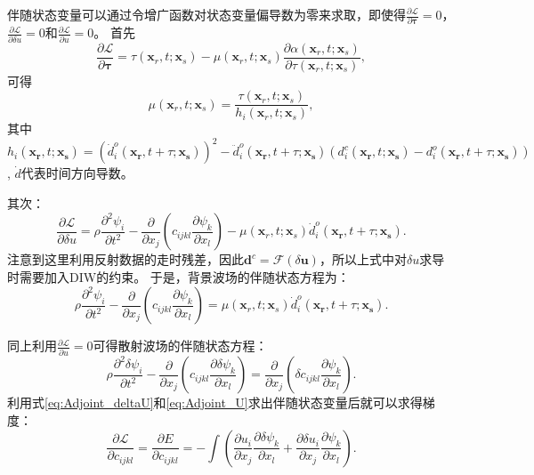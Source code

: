 伴随状态变量可以通过令增广函数对状态变量偏导数为零来求取，即使得$\frac{\partial \mathcal{L}}{\partial \mathbf{\tau}}=0$，
$\frac{\partial \mathcal{L}}{\partial \delta u}=0$和$\frac{\partial \mathcal{L}}{\partial 
	u}=0$。
首先
\begin{equation}
	\frac{\partial \mathcal{L}}{\partial \mathbf{\tau}}=\tau(\mathbf{x}_r,t;\mathbf{x}_s)
	-\mu(\mathbf{x}_r,t;\mathbf{x}_s)\frac{\partial \alpha(\mathbf{x}_r,t;\mathbf{x}_s)}{\partial \tau(\mathbf{x}_r,t;\mathbf{x}_s)},
        \label{eq:PartialTau}
\end{equation}
可得
\begin{equation}
	\mu(\mathbf{x}_r,t;\mathbf{x}_s)=\frac{\tau(\mathbf{x}_r,t;\mathbf{x}_s)}{ h_i(\mathbf{x}_r,t;\mathbf{x}_s)},
        \label{eq:AdjointTau}
\end{equation}
其中$h_i(\mathbf{x_r},t;\mathbf{x_s})=(\dot{d}^o_i(\mathbf{x_r},t+\tau;\mathbf{x_s}))^2-\ddot{d}^o_i(\mathbf{x_r},t+\tau;\mathbf{x_s})
(d^c_i(\mathbf{x_r},t;\mathbf{x_s})-d^o_i(\mathbf{x_r},t+\tau;\mathbf{x_s}))$, $\dot{d}$代表时间方向导数。

其次：
\begin{equation}
	\frac{\partial \mathcal{L}}{\partial \delta u}=
	\rho\frac{\partial^2 {\psi}_i }{\partial t^2}
	-\frac{\partial}{\partial x_j}(c_{ijkl}\frac{\partial {\psi}_k}{\partial x_l})-\mu(\mathbf{x}_r,t;\mathbf{x}_s)
	\dot{d}^o_i(\mathbf{x_r},t+\tau;\mathbf{x_s}).
        \label{eq:Partial_U}
\end{equation}
注意到这里利用反射数据的走时残差，因此$\mathbf{d}^c=\mathcal{F}(\delta
\mathbf{u})$，所以上式中对$\delta u$求导时需要加入DIW的约束。
于是，背景波场的伴随状态方程为：
\begin{equation}
	\rho\frac{\partial^2 {\psi}_i }{\partial t^2}
	-\frac{\partial}{\partial x_j}(c_{ijkl}\frac{\partial {\psi}_k}{\partial x_l})=\mu(\mathbf{x}_r,t;\mathbf{x}_s)
	\dot{d}^o_i(\mathbf{x_r},t+\tau;\mathbf{x_s}).
        \label{eq:Adjoint_deltaU}
\end{equation}

同上利用$\frac{\partial \mathcal{L}}{\partial u}=0$可得散射波场的伴随状态方程：
\begin{equation}
	\rho\frac{\partial^2 \delta {\psi}_i }{\partial t^2}
	-\frac{\partial}{\partial x_j}(c_{ijkl}\frac{\partial \delta {\psi}_k}{\partial x_l})=
	\frac{\partial}{\partial x_j}(\delta c_{ijkl}\frac{\partial {\psi}_k}{\partial x_l}).
        \label{eq:Adjoint_U}
\end{equation}
利用式\eqref{eq:Adjoint_deltaU}和\eqref{eq:Adjoint_U}求出伴随状态变量后就可以求得梯度：
\begin{equation}
	\frac{\partial \mathcal{L}}{\partial c_{ijkl}}=
    \frac{\partial E}{\partial c_{ijkl}}=-\int (\frac{\partial u_{i}}{\partial
    x_j}\frac{\partial \delta{\psi}_{k}}{\partial x_l}+\frac{\partial \delta {u}_{i}}{\partial
    x_j}\frac{\partial \psi_{k}}{\partial x_l}).
    \label{eq:GradientCijkl1}
\end{equation}

